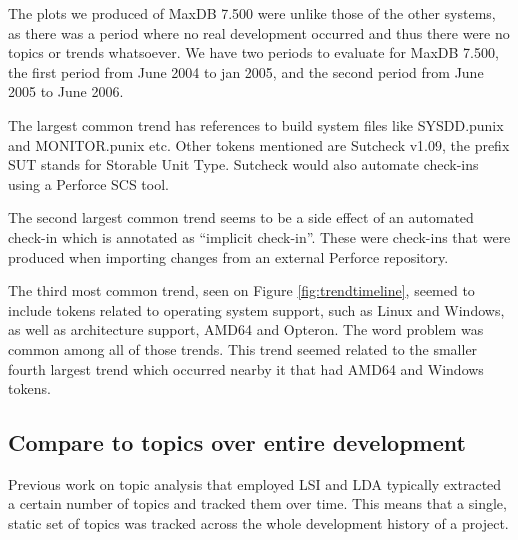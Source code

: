 \documentclass[times, 10pt,twocolumn]{article}
\begin{document}
The plots we produced of MaxDB 7.500 were 
unlike those of the other systems, as 
 there was a
period where no real development occurred and thus there were no topics or trends
whatsoever. We have two periods to evaluate for MaxDB 7.500, the first
period from June 2004 to jan 2005, and the second period from June
2005 to June 2006.

The largest common trend has references to build system files like
SYSDD.punix and MONITOR.punix etc. Other tokens mentioned are Sutcheck
v1.09, the prefix SUT stands for Storable Unit Type. Sutcheck would
also automate check-ins using a Perforce SCS tool.

The second largest common trend seems to be a side effect of an
automated check-in which is annotated as ``implicit check-in''. These
were check-ins that were produced when importing changes from an
external Perforce repository.

The third most common trend, seen on Figure \ref{fig:trendtimeline}, seemed to
include tokens related to operating system support, such as Linux and
Windows, as well as architecture support, AMD64 and Opteron. The word
problem was common among all of those trends. This trend seemed
related to the smaller fourth largest trend which occurred nearby it
that had AMD64 and Windows tokens.

\subsection{Compare to topics over entire development}





Previous work on topic analysis that employed LSI and LDA typically
extracted a certain number of topics and tracked them over time. This
means that a single, static set of topics was tracked across the whole
development history of a project. 
\end{document}
